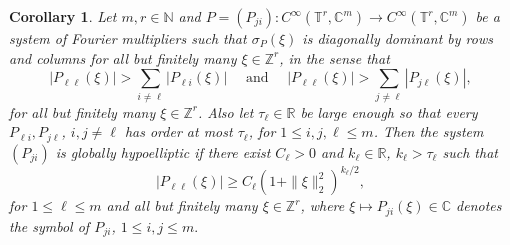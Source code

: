 \documentclass[11pt]{amsart}
\numberwithin{theorem}{section}
\numberwithin{equation}{section}
\newtheorem{corollary}[theorem]{Corollary}
\theoremstyle{definition}
\numberwithin{example}{section}
\theoremstyle{definition}
\theoremstyle{definition}
\newcommand{\R}{\mathbb{R}}
\newcommand{\Z}{\mathbb{Z}}
\newcommand{\N}{\mathbb{N}}
\newcommand{\T}{\mathbb{T}}
\begin{document}
\begin{corollary}\label{coro_toro_diag}
    Let $m,r\in\N$ and $P=(P_{ji}):C^\infty(\T^r,\mathbb{C}^m)\to C^\infty(\T^r,\mathbb{C}^m)$ be a system of Fourier multipliers such that $\sigma_P(\xi)$ is diagonally dominant by rows and columns for all but finitely many $\xi\in\Z^r$, in the sense that
  \begin{equation}\label{diag_dom}
    |P_{\ell\ell}(\xi)|>\sum_{i\neq \ell}|P_{\ell i}(\xi)|\quad\text{ and }\quad |P_{\ell\ell}(\xi)|>\sum_{j\neq \ell}|P_{j\ell}(\xi)|,
\end{equation}
for all but finitely many $\xi\in\Z^r$.
    Also let $\tau_\ell\in\R$ be large enough so that every $P_{\ell i},P_{j \ell}$, $i,j\neq \ell$ has order at most $\tau_\ell$, for $1\leq i,j,\ell\leq m$. 
    Then the system $(P_{ji})$ is globally hypoelliptic if there exist $C_\ell>0$ and $k_\ell\in\R$, $k_\ell>\tau_\ell$ such that
    \begin{equation}\label{cond_coro}
        |{P_{\ell\ell}}(\xi)|\geq C_\ell(1+\|\xi\|_2^2)^{k_\ell/2},
    \end{equation}
    for $1\leq \ell\leq m$ and all but finitely many $\xi\in\Z^r$, where $\xi\mapsto P_{ji}(\xi)\in\mathbb{C}$ denotes the symbol of $P_{ji}$, $1\leq i,j\leq m.$
\end{corollary}
\end{document}
